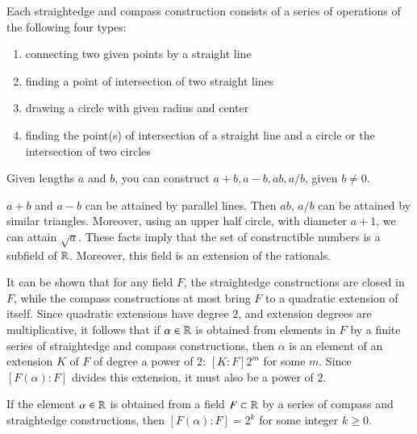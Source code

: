 Each straightedge and compass construction consists of a series of operations of the following four types: 
\begin{enumerate}
    \item connecting two given points by a straight line
    \item finding a point of intersection of two straight lines
    \item drawing a circle with given radius and center
    \item finding the point(s) of intersection of a straight line and a circle or the intersection of two circles
\end{enumerate}


\begin{theorem}
    Given lengths $a$ and $b$, you can construct $a+b,a-b,ab,a/b$, given $b \neq 0$. 
\end{theorem}

$a+b$ and $a-b$ can be attained by parallel lines. Then $ab$, $a/b$ can be attained by similar triangles. Moreover, using an upper half circle, with diameter $a+1$, we can attain $\sqrt{a}$. These facts imply that the set of constructible numbers is a subfield of $\mathbb R$. Moreover, this field is an extension of the rationals. 

It can be shown that for any field $F$, the straightedge constructions are closed in $F$, while the compass constructions at most bring $F$ to a quadratic extension of itself. Since quadratic extensions have degree $2$, and extension degrees are multiplicative, it follows that if $\alpha \in \mathbb R$ is obtained from elements in $F$ by a finite series of straightedge and compass constructions, then $\alpha$ is an element of an extension $K$ of $F$ of degree a power of $2$: $[K:F] 2^m$ for some $m$. Since $[F(\alpha):F]$ divides this extension, it must also be a power of $2$.

\begin{proposition}
    If the element $\alpha \in \mathbb R$ is obtained from a field $F \subset \mathbb R$ by a series of compass and straightedge constructions, then $[F(\alpha):F] = 2^k$ for some integer $k \geq 0$.
\end{proposition}

